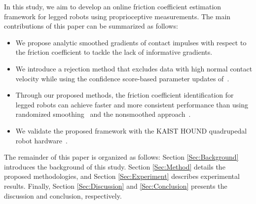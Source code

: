 In this study, we aim to develop an online friction coefficient estimation framework for legged robots using proprioceptive measurements. The main contributions of this paper can be summarized as follows:
\begin{itemize}
\item We propose analytic smoothed gradients of contact impulses with respect to the friction coefficient to tackle the lack of informative gradients. 
\item We introduce a rejection method that excludes data with high normal contact velocity while using the confidence score-based parameter updates of~\cite{chen2022real}.
\item Through our proposed methods, the friction coefficient identification for legged robots can achieve faster and more consistent performance than using randomized smoothing~\cite{Pang2023TRO,le2024leveraging} and the nonsmoothed approach~\cite{chen2022real}.
\item We validate the proposed framework with the KAIST HOUND quadrupedal robot hardware~\cite{shin2022hound}.
\end{itemize}


The remainder of this paper is organized as follows: Section \ref{Sec:Background} introduces the background of this study. Section \ref{Sec:Method} details the proposed methodologies, and Section \ref{Sec:Experiment} describes experimental results. Finally, Section \ref{Sec:Discussion} and \ref{Sec:Conclusion} presents the discussion and conclusion, respectively.


